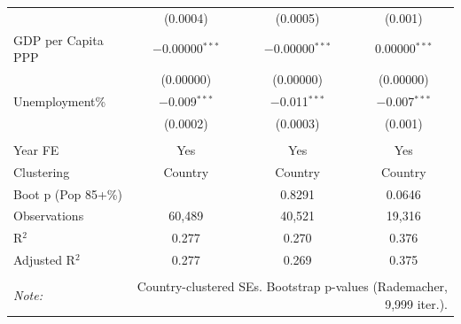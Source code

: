 \begin{table}[!htbp]
\begin{tabular}{@{\extracolsep{5pt}}lccc}
  & (0.0004) & (0.0005) & (0.001) \\ 
  GDP per Capita PPP & $-$0.00000$^{***}$ & $-$0.00000$^{***}$ & 0.00000$^{***}$ \\ 
  & (0.00000) & (0.00000) & (0.00000) \\ 
  Unemployment\% & $-$0.009$^{***}$ & $-$0.011$^{***}$ & $-$0.007$^{***}$ \\ 
  & (0.0002) & (0.0003) & (0.001) \\ 
 \hline \\[-1.8ex] 
Year FE & Yes & Yes & Yes \\ 
Clustering & Country & Country & Country \\ 
Boot p (Pop 85+\%) &  & 0.8291 & 0.0646 \\ 
Observations & 60,489 & 40,521 & 19,316 \\ 
R$^{2}$ & 0.277 & 0.270 & 0.376 \\ 
Adjusted R$^{2}$ & 0.277 & 0.269 & 0.375 \\ 
\hline 
\hline \\[-1.8ex] 
\textit{Note:}  & \multicolumn{3}{r}{Country-clustered SEs. Bootstrap p-values (Rademacher, 9,999 iter.).} \\ 
\end{tabular} 
\end{table} 
